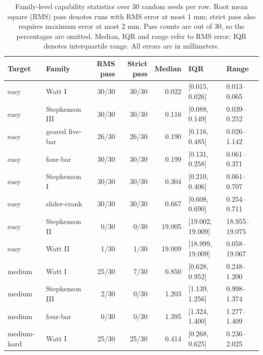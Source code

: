 \begin{table}[H]
\caption{Family-level capability statistics over 30 random seeds per row. Root mean square (RMS) pass denotes runs with RMS error at most 1 mm; strict pass also requires maximum error at most 2 mm. Pass counts are out of 30, so the percentages are omitted. Median, IQR and range refer to RMS error; IQR denotes interquartile range. All errors are in millimeters.}
\label{tab:family_capability_statistics}
\centering
\footnotesize
\setlength{\tabcolsep}{4pt}
\begin{tabular}{llrrrll}
\hline
Target & Family & RMS pass & Strict pass & Median & IQR & Range \\
\hline
easy & Watt I & 30/30 & 30/30 & 0.022 & [0.015, 0.026] & 0.013--0.065 \\
easy & Stephenson III & 30/30 & 30/30 & 0.116 & [0.088, 0.149] & 0.039--0.252 \\
easy & geared five-bar & 26/30 & 26/30 & 0.190 & [0.116, 0.485] & 0.026--1.142 \\
easy & four-bar & 30/30 & 30/30 & 0.199 & [0.131, 0.258] & 0.061--0.371 \\
easy & Stephenson I & 30/30 & 30/30 & 0.304 & [0.210, 0.406] & 0.061--0.707 \\
easy & slider-crank & 30/30 & 30/30 & 0.667 & [0.608, 0.690] & 0.254--0.711 \\
easy & Stephenson II & 0/30 & 0/30 & 19.005 & [19.002, 19.009] & 18.955--19.075 \\
easy & Watt II & 1/30 & 1/30 & 19.009 & [18.999, 19.009] & 0.058--19.067 \\
medium & Watt I & 25/30 & 7/30 & 0.850 & [0.628, 0.952] & 0.248--1.200 \\
medium & Stephenson III & 2/30 & 0/30 & 1.203 & [1.139, 1.256] & 0.998--1.374 \\
medium & four-bar & 0/30 & 0/30 & 1.395 & [1.324, 1.400] & 1.277--1.409 \\
medium-hard & Watt I & 25/30 & 25/30 & 0.414 & [0.268, 0.625] & 0.236--2.025 \\
\hline
\end{tabular}
\end{table}
